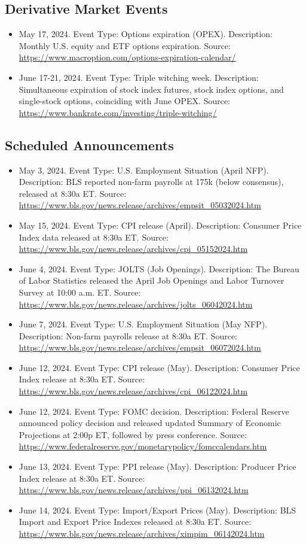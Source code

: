\documentclass[10pt,a4paper,oneside]{article}
\begin{document}
\subsection{Derivative Market Events}

\begin{itemize}
    \item May 17, 2024. Event Type: Options expiration (OPEX). Description: Monthly U.S. equity and ETF options expiration. Source: \url{https://www.macroption.com/options-expiration-calendar/}
    \item June 17-21, 2024. Event Type: Triple witching week. Description: Simultaneous expiration of stock index futures, stock index options, and single-stock options, coinciding with June OPEX. Source: \url{https://www.bankrate.com/investing/triple-witching/}
\end{itemize}

\subsection{Scheduled Announcements}

\begin{itemize}
    \item May 3, 2024. Event Type: U.S. Employment Situation (April NFP). Description: BLS reported non-farm payrolls at 175k (below consensus), released at 8:30a ET. Source: \url{https://www.bls.gov/news.release/archives/empsit_05032024.htm}
    \item May 15, 2024. Event Type: CPI release (April). Description: Consumer Price Index data released at 8:30a ET. Source: \url{https://www.bls.gov/news.release/archives/cpi_05152024.htm}
    \item June 4, 2024. Event Type: JOLTS (Job Openings). Description: The Bureau of Labor Statistics released the April Job Openings and Labor Turnover Survey at 10:00 a.m. ET. Source: \url{https://www.bls.gov/news.release/archives/jolts_06042024.htm}
    \item June 7, 2024. Event Type: U.S. Employment Situation (May NFP). Description: Non-farm payrolls release at 8:30a ET. Source: \url{https://www.bls.gov/news.release/archives/empsit_06072024.htm}
    \item June 12, 2024. Event Type: CPI release (May). Description: Consumer Price Index release at 8:30a ET. Source: \url{https://www.bls.gov/news.release/archives/cpi_06122024.htm}
    \item June 12, 2024. Event Type: FOMC decision. Description: Federal Reserve announced policy decision and released updated Summary of Economic Projections at 2:00p ET, followed by press conference. Source: \url{https://www.federalreserve.gov/monetarypolicy/fomccalendars.htm}
    \item June 13, 2024. Event Type: PPI release (May). Description: Producer Price Index release at 8:30a ET. Source: \url{https://www.bls.gov/news.release/archives/ppi_06132024.htm}
    \item June 14, 2024. Event Type: Import/Export Prices (May). Description: BLS Import and Export Price Indexes released at 8:30a ET. Source: \url{https://www.bls.gov/news.release/archives/ximpim_06142024.htm}
\end{itemize}
\end{document}
